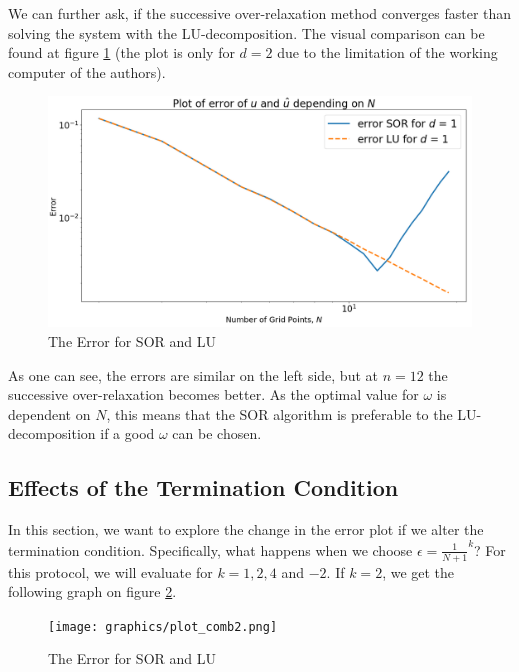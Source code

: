 We can further ask, if the successive over-relaxation method converges faster than solving the system with the LU-decomposition. The visual comparison can be found at figure \ref{fig:boat2} (the plot is only for \(d = 2\) due to the limitation of the working computer of the authors).

\begin{figure}[h]
	\includegraphics[width=\linewidth]{graphics/plot_error_both.png}
	\caption{The Error for SOR and LU}
	\label{fig:boat2}
\end{figure}

As one can see, the errors are similar on the left side, but at \(n = 12\) the successive over-relaxation becomes better. As the optimal value for \(\omega\) is dependent on \(N\), this means that the SOR algorithm is preferable to the LU-decomposition if a good \(\omega\) can be chosen.

\subsection{Effects of the Termination Condition}

In this section, we want to explore the change in the error plot if we alter the termination condition. Specifically, what happens when we choose \(\epsilon = \frac{1}{N + 1}^k\)? For this protocol, we will evaluate for \(k = 1, 2, 4\) and \(-2\).
If \(k = 2\), we get the following graph on figure \ref{fig:boat3}.

\begin{figure}[h]
    \begin{center}
	    \texttt{[image: graphics/plot\_comb2.png]}
        \caption{The Error for SOR and LU}\label{fig:boat3}
    \end{center}
\end{figure}

